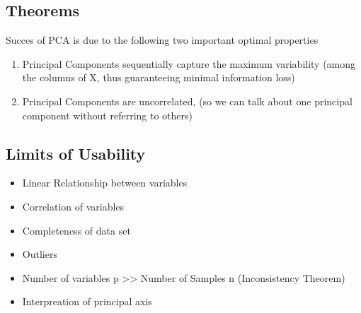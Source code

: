 \documentclass{beamer}
\theoremstyle{plain}
\theoremstyle{definition}
\begin{document}
\subsection{Theorems}

\begin{frame}
Succes of PCA is due to the following two important optimal properties
\begin{enumerate}
\item Principal Components sequentially capture the maximum variability (among the columns of X, thus guaranteeing minimal information loss)
\item Principal Components are uncorrelated, (so we can talk about one principal component without referring to others)
\end{enumerate}
\end{frame}
\subsection{Limits of Usability}
\begin{frame}
\begin{itemize}
\item Linear Relationship between variables
\item Correlation of variables
\item Completeness of data set
\item Outliers
\item Number of variables p >> Number of Samples n (Inconsistency Theorem)
\item Interpreation of principal axis
\end{itemize}


\end{frame}
\end{document}
